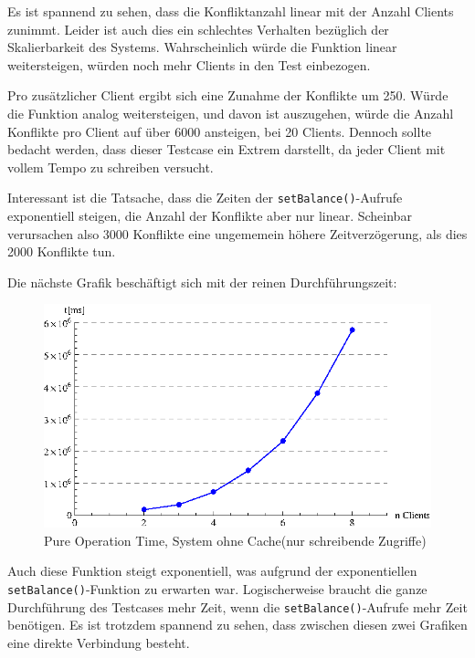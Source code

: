 Es ist spannend zu sehen, dass die Konfliktanzahl linear mit der Anzahl Clients zunimmt. Leider ist auch dies ein schlechtes Verhalten bezüglich der Skalierbarkeit des Systems. Wahrscheinlich würde die Funktion linear weitersteigen, würden noch mehr Clients in den Test einbezogen. 

Pro zusätzlicher Client ergibt sich eine Zunahme der Konflikte um 250. Würde die Funktion analog weitersteigen, und davon ist auszugehen, würde die Anzahl Konflikte pro Client auf über 6000 ansteigen, bei 20 Clients. Dennoch sollte bedacht werden, dass dieser Testcase ein Extrem darstellt, da jeder Client mit vollem Tempo zu schreiben versucht. 

Interessant ist die Tatsache, dass die Zeiten der \texttt{setBalance()}-Aufrufe exponentiell steigen, die Anzahl der Konflikte aber nur linear. Scheinbar verursachen also 3000 Konflikte eine ungememein höhere Zeitverzögerung, als dies 2000 Konflikte tun. 

Die nächste Grafik beschäftigt sich mit der reinen Durchführungszeit:
\begin{figure}[H]
\begin{center}
\includegraphics[width=\textwidth]{images_MessErgebnisse/incrementCachePureOperationTime.eps}
\end{center}
\caption{Pure Operation Time, System ohne Cache(nur schreibende Zugriffe)}
\end{figure}

Auch diese Funktion steigt exponentiell, was aufgrund der exponentiellen \texttt{setBalance()}-Funktion zu erwarten war. Logischerweise braucht die ganze Durchführung des Testcases mehr Zeit, wenn die \texttt{setBalance()}-Aufrufe mehr Zeit benötigen. Es ist trotzdem spannend zu sehen, dass zwischen diesen zwei Grafiken eine direkte Verbindung besteht.

